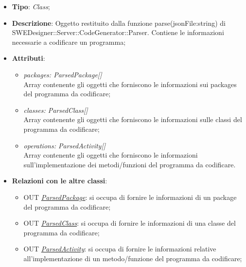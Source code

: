 \documentclass[../DefinizioneDiProdotto.tex]{subfiles}
\begin{document}
				\begin{itemize}
				\item \textbf{Tipo}: \emph{Class};
				\item \textbf{Descrizione}: Oggetto restituito dalla funzione parse(jsonFile:string) di SWEDesigner::Server::CodeGenerator::Parser. Contiene le informazioni necessarie a codificare un programma;
				\item \textbf{Attributi}:
				\begin{itemize}
					\item \emph{packages: ParsedPackage[]}\\
					Array contenente gli oggetti che forniscono le informazioni sui packages del programma da codificare;
					\item \emph{classes: ParsedClass[]} \\
					Array contenente gli oggetti che forniscono le informazioni sulle classi del programma da codificare;
					\item \emph{operations: ParsedActivity[]} \\
					Array contenente gli oggetti che forniscono le informazioni sull'implementazione dei metodi/funzioni del programma da codificare.
				\end{itemize}
				\item \textbf{Relazioni con le altre classi}:
				\begin{itemize}
					\item OUT \hyperlink{SWEDesigner::Server::CodeGenerator::Coder::ParsedElements::ParsedPackage}{\emph{ParsedPackage}}: si occupa di fornire le informazioni di un package del programma da codificare;
					\item OUT \hyperlink{SWEDesigner::Server::CodeGenerator::Coder::ParsedElements::ParsedClass}{\emph{ParsedClass}}: si occupa di fornire le informazioni di una classe del programma da codificare;
					\item OUT \hyperlink{SWEDesigner::Server::CodeGenerator::Coder::ParsedElements::ParsedActivity}{\emph{ParsedActivity}}: si occupa di fornire le informazioni relative all'implementazione di un metodo/funzione del programma da codificare;
				\end{itemize}
			\end{itemize}
\end{document}
